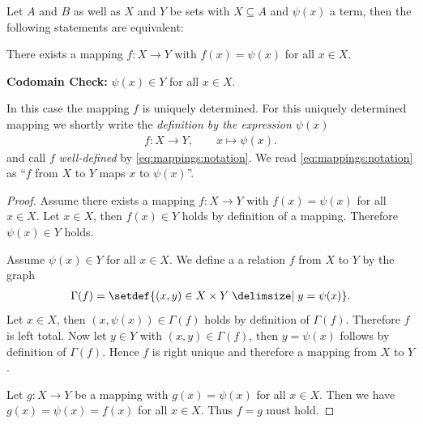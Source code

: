 \begin{theorem}\label{theorem:mappings:well_defined_codomain}
    Let $A$ and $B$ as well as $X$ and $Y$ be sets with $X\subseteq A$ and $\psi(x)$ a term, then the following statements are equivalent:
    \begin{intheoremenumerate}
        \item There exists a mapping $f\colon X\rightarrow Y$ with $f(x)=\psi(x)$ for all $x\in X$.
        \item\textbf{Codomain Check:} $\psi(x)\in Y$ for all $x\in X$.
    \end{intheoremenumerate}
    In this case the mapping $f$ is uniquely determined. For this uniquely determined mapping we shortly write the \emph{definition by the expression $\psi(x)$}
    \begin{align}f\colon X\rightarrow Y,\qquad x\mapsto \psi(x).\label{eq:mappings:notation}\end{align}
    and call $f$ \emph{well-defined} by \eqref{eq:mappings:notation}. We read \eqref{eq:mappings:notation} as \enquote{$f$ from $X$ to $Y$ maps $x$ to $\psi(x)$}.
\end{theorem}
\begin{proof}
     Assume there exists a mapping $f\colon X\rightarrow Y$ with $f(x)=\psi(x)$ for all $x\in X$. Let $x\in X$, then $f(x)\in Y$ holds by definition of a mapping. Therefore $\psi(x)\in Y$ holds.

     Assume $\psi(x)\in Y$ for all $x\in X$. We define a a relation $f$ from $X$ to $Y$ by the graph \begin{align}\Gamma(f)=\setdef{(x,y)\in X\times Y\given y=\psi(x)}.\end{align}
    Let $x\in X$, then $(x,\psi(x))\in\Gamma(f)$ holds by definition of $\Gamma(f)$. Therefore $f$ is left total. Now let $y\in Y$ with $(x,y)\in\Gamma(f)$, then $y=\psi(x)$ follows by definition of $\Gamma(f)$. Hence $f$ is right unique and therefore a mapping from $X$ to $Y$.

     Let $g\colon X\rightarrow Y$ be a mapping with $g(x)=\psi(x)$ for all $x\in X$. Then we have $g(x)=\psi(x)=f(x)$ for all $x\in X$. Thus $f=g$ must hold.
\end{proof}


